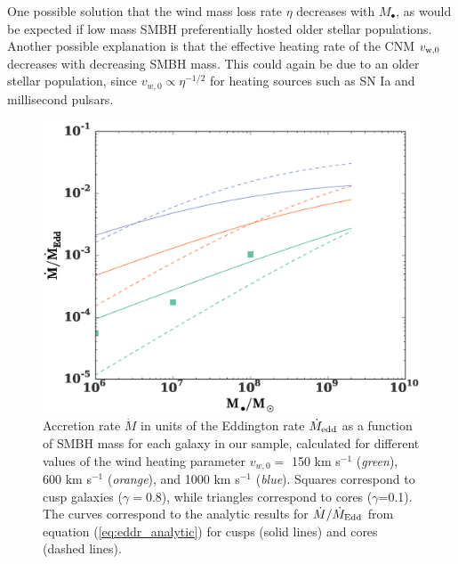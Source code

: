 \documentclass[usenatbib,fleqn]{mn2e}
\newcommand{\eddr}{\dot{M}/\dot{M}_{\rm Edd}}
\newcommand{\Mbh}[1][]{M_{\bullet#1}}
\newcommand{\vwO}{v_{w,0}}
\begin{document}
One possible solution that the wind mass loss rate $\eta$ decreases
with $\Mbh$, as would be expected if low mass SMBH preferentially
hosted older stellar populations.  Another possible explanation is
that the effective heating rate of the CNM $v_{\rm w,0}$ decreases
with decreasing SMBH mass.  This could again be due to an older
stellar population, since $v_{w,0} \propto \eta^{-1/2}$ for heating
sources such as SN Ia and millisecond pulsars.

\begin{figure}
  \includegraphics[width=\columnwidth]{mdot_mass.eps}
  \caption{\label{fig:mdot_mass} Accretion rate $\dot{M}$ in units of
    the Eddington rate $\dot{M}_{\rm edd}$ as a function of SMBH mass
    for each galaxy in our sample, calculated for different values of
    the wind heating parameter $\vwO =$ 150 km s$^{-1}$ ({\it green}),
    600 km s$^{-1}$ ({\it orange}), and 1000 km s$^{-1}$ ({\it blue}).
    Squares correspond to cusp galaxies ($\gamma=0.8$), while
    triangles correspond to cores ($\gamma$=0.1). The curves correspond
    to the analytic results for $\eddr$ from equation
    (\ref{eq:eddr_analytic}) for cusps (solid lines) and cores (dashed
    lines).  }
\end{figure}
\end{document}
